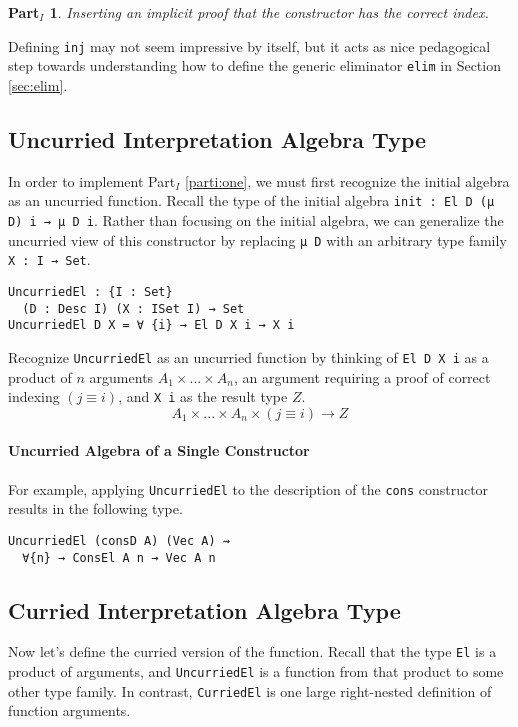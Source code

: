 \documentclass[nonatbib]{sigplanconf}
\newtheorem{myparti}{Part$_I$}
\newcommand{\refsec}[1]{Section \ref{sec:#1}}
\newcommand{\refparti}[1]{Part$_I$ \ref{parti:#1}}
\begin{document}
\begin{myparti}
\label{parti:two}
Inserting an implicit proof that the constructor has the correct index.
\end{myparti}

Defining {\tt inj} may not seem impressive by itself, but it acts as
nice pedagogical step towards understanding how to define the generic
eliminator {\tt elim} in \refsec{elim}.

\subsection{Uncurried Interpretation Algebra Type}

In order to implement \refparti{one}, we must first recognize the
initial algebra as an uncurried function. Recall the type of the
initial algebra {\tt init : El D (μ D) i → μ D i}. Rather than
focusing on the initial algebra, we can generalize the uncurried view
of this constructor by replacing {\tt μ D} with an arbitrary
type family {\tt X : I → Set}.

\begin{verbatim}
UncurriedEl : {I : Set}
  (D : Desc I) (X : ISet I) → Set
UncurriedEl D X = ∀ {i} → El D X i → X i
\end{verbatim}

Recognize {\tt UncurriedEl} as an uncurried function by thinking of
{\tt El D X i} as a product of $n$ arguments $A_1 × ... × A_n$, an
argument requiring a proof of correct indexing $(j≡i)$, and
{\tt X i} as the result type $Z$.
\[
A_1 × ... × A_n × (j ≡ i) → Z
\]

\paragraph{Uncurried Algebra of a Single Constructor}

For example, applying {\tt UncurriedEl} to the description of the
{\tt cons} constructor results in the following type.

\begin{verbatim}
UncurriedEl (consD A) (Vec A) ⇝
  ∀{n} → ConsEl A n → Vec A n
\end{verbatim}

\subsection{Curried Interpretation Algebra Type}

Now let's define the curried version of the function. Recall that the
type {\tt El} is a product of arguments, and {\tt UncurriedEl} is a
function from that product to some other type family. In contrast,
{\tt CurriedEl} is one large right-nested definition of function
arguments.
\end{document}
